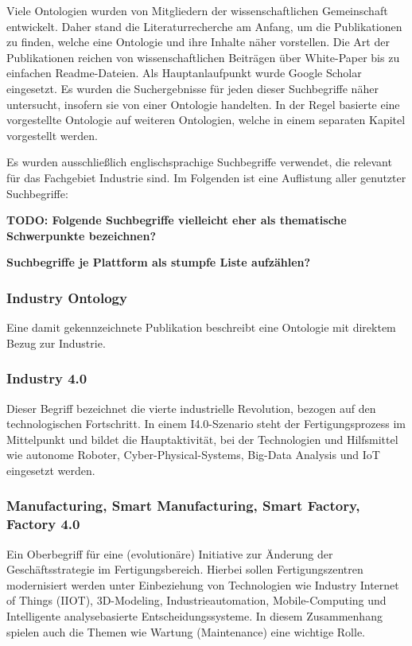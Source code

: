 \documentclass{article}
\begin{document}
Viele Ontologien wurden von Mitgliedern der wissenschaftlichen Gemeinschaft entwickelt.
Daher stand die Literaturrecherche am Anfang, um die Publikationen zu finden, welche eine Ontologie und ihre Inhalte näher vorstellen.
Die Art der Publikationen reichen von wissenschaftlichen Beiträgen über White-Paper bis zu einfachen Readme-Dateien.
Als Hauptanlaufpunkt wurde Google Scholar eingesetzt.
Es wurden die Suchergebnisse für jeden dieser Suchbegriffe näher untersucht, insofern sie von einer Ontologie handelten.
In der Regel basierte eine vorgestellte Ontologie auf weiteren Ontologien, welche in einem separaten Kapitel vorgestellt werden.

Es wurden ausschließlich englischsprachige Suchbegriffe verwendet, die relevant für das Fachgebiet Industrie sind.
Im Folgenden ist eine Auflistung aller genutzter Suchbegriffe:

\textbf{TODO: Folgende Suchbegriffe vielleicht eher als thematische Schwerpunkte bezeichnen?}

\textbf{Suchbegriffe je Plattform als stumpfe Liste aufzählen?}

\subsubsection{Industry Ontology}

Eine damit gekennzeichnete Publikation beschreibt eine Ontologie mit direktem Bezug zur Industrie.

\subsubsection{Industry 4.0}

Dieser Begriff bezeichnet die vierte industrielle Revolution, bezogen auf den technologischen Fortschritt. In einem I4.0-Szenario steht der Fertigungsprozess im Mittelpunkt und bildet die Hauptaktivität, bei der Technologien und Hilfsmittel wie autonome Roboter, Cyber-Physical-Systems, Big-Data Analysis und IoT eingesetzt werden.

\subsubsection{Manufacturing, Smart Manufacturing, Smart Factory, Factory 4.0}

Ein Oberbegriff für eine (evolutionäre) Initiative zur Änderung der Geschäftsstrategie im Fertigungsbereich.
Hierbei sollen Fertigungszentren modernisiert werden unter Einbeziehung von Technologien wie Industry Internet of Things (IIOT), 3D-Modeling, Industrieautomation, Mobile-Computing und Intelligente analysebasierte Entscheidungssysteme.
In diesem Zusammenhang spielen auch die Themen wie Wartung (Maintenance) eine wichtige Rolle.
\end{document}
